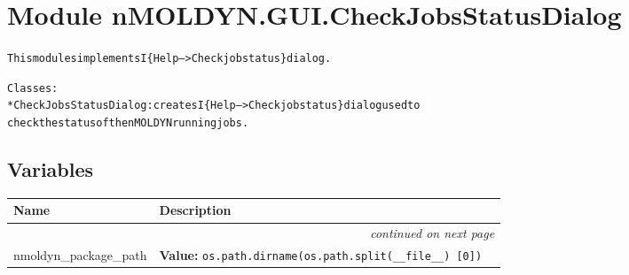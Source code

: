 %
%
%


\section{Module nMOLDYN.GUI.CheckJobsStatusDialog}

    \label{nMOLDYN:GUI:CheckJobsStatusDialog}
\begin{alltt}
This modules implements I\{Help--{\textgreater}Check job status\} dialog.

Classes:
    * CheckJobsStatusDialog: creates I\{Help--{\textgreater}Check job status\} dialog used to 
    check the status of the nMOLDYN running jobs.
\end{alltt}



  \subsection{Variables}

    \vspace{-1cm}
\hspace{\varindent}\begin{longtable}{|p{\varnamewidth}|p{\vardescrwidth}|l}
\cline{1-2}
\cline{1-2} \centering \textbf{Name} & \centering \textbf{Description}& \\
\cline{1-2}
\endhead\cline{1-2}\multicolumn{3}{r}{\small\textit{continued on next page}}\\\endfoot\cline{1-2}
\endlastfoot\raggedright n\-m\-o\-l\-d\-y\-n\-\_\-p\-a\-c\-k\-a\-g\-e\-\_\-p\-a\-t\-h\- & \raggedright \textbf{Value:} 
{\tt os.path.dirname(os.path.split(\_\_file\_\_) [0])}&\\
\cline{1-2}
\end{longtable}


